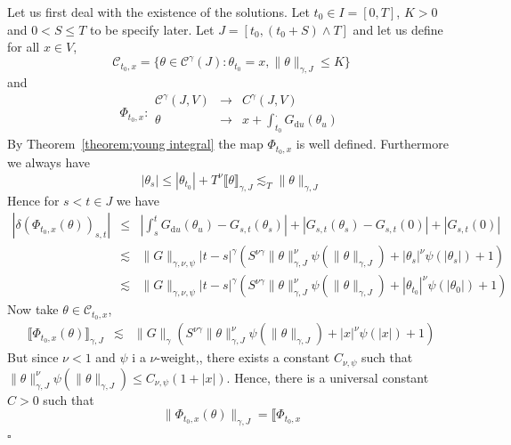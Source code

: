 \documentclass[a4paper,11pt]{article}
\newcommand{\mathd}{\mathrm{d}}
\newcommand{\nocomma}{}
\newenvironment{proof}{{\sc Proof.}}{\hfill$\square$}
\newcommand{\CC}{\mathscr C}
\begin{document}
\begin{proof}
  Let us first deal with the existence of the solutions. Let $t_{0} \in I= [
  0,T ]$, $K>0$ and $0<S \leqslant T$ to be specify later. Let $J= [t_{0}
  ,(t_{0} +S) \wedge T]$ and let us define for all $x \in V$,
  \[ \mathcal{C}_{t_{0} ,x} = \{\theta \in \CC^{\gamma} (J): \theta_{t_{0}}
     =x,\| \theta \|_{\gamma ,J} \leqslant K\} \]
  and
  \[ \Phi_{t_{0} ,x} : \begin{array}{ccc}
       \CC^{\gamma} (J,V) & \rightarrow & C^{\gamma} (J \nocomma ,V)\\
       \theta & \rightarrow & x+ \int_{t_{0}}^{.} G_{\mathd u} ( \theta_{u} )
     \end{array} \]
  By Theorem~\ref{theorem:young integral} the map $\Phi_{t_{0} ,x}$ is well defined.
  Furthermore we always have
  \[ | \theta_{s} | \leqslant | \theta_{t_{0}} | +T^{\nu} \llbracket \theta
     \rrbracket_{\gamma ,J} \lesssim_{T} \| \theta \|_{\gamma ,J} \]
  Hence for $s<t \in J$ we have
  \begin{eqnarray}
    | \delta ( \Phi_{t_{0} ,x} ( \theta ))_{s,t} | & \leqslant & \left\lvert
    \int_{s}^{t} G_{\mathd u} ( \theta_{u} )-G_{s,t} ( \theta_{s} ) \right\lvert +
    |G_{s,t} ( \theta_{s} )-G_{s,t} (0)| + |G_{s,t} (0)| \nonumber\\
    & \lesssim & \|G\|_{\gamma , \nu , \psi}  |t-s|^{\gamma}  ( S^{\nu
    \gamma} \| \theta \|^{\nu}_{\gamma ,J} \psi ( \| \theta \|_{\gamma ,J} ) +
    | \theta_{s} |^{\nu} \psi ( | \theta_{s} | ) +1 ) \nonumber\\
    & \lesssim & \|G\|_{\gamma , \nu , \psi}  |t-s|^{\gamma}  ( S^{\nu
    \gamma} \| \theta \|^{\nu}_{\gamma ,J} \psi ( \| \theta \|_{\gamma ,J} )
    +| \theta_{t_{0}} |^{\nu} \psi ( | \theta_{0} | ) +1 )  \label{majoration
    bound}
  \end{eqnarray}
  Now take $\theta \in \mathcal{C}_{t_{0} ,x}$,
  \begin{eqnarray*}
    \llbracket \Phi_{t_{0} ,x} ( \theta ) \rrbracket_{\gamma ,J} & \lesssim &
    \|G\|_{\gamma} (S^{\nu \gamma} \| \theta \|^{\nu}_{\gamma ,J} \psi ( \|
    \theta \|_{\gamma ,J} ) +|x|^{\nu} \psi ( | x | ) +1)
  \end{eqnarray*}
  But since $\nu <1$ and $\psi$ i a $\nu$-weight,, there exists a constant
  $C_{\nu , \psi}$ such that $\| \theta \|^{\nu}_{\gamma ,J} \psi ( \| \theta
  \|_{\gamma ,J} ) \leqslant C_{\nu , \psi} ( 1+ | x | )$. Hence, there is a
  universal constant $C>0$ such that
  \[ \| \Phi_{t_{0} ,x} ( \theta ) \|_{\gamma ,J} = \llbracket \Phi_{t_{0} ,x}
\]
\end{proof}
\end{document}

